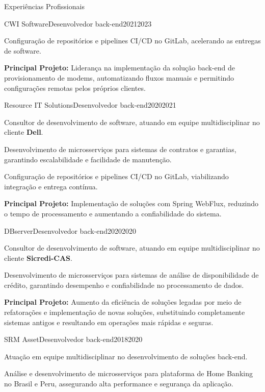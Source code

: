 \documentclass{domingosfelipe-resume}
\begin{document}
\begin{rSection}{Experiências Profissionais}
\begin{rExperienceSubsection}{CWI Software}{Desenvolvedor back-end}{2021}{2023}
        \item Configuração de repositórios e pipelines CI/CD no GitLab, acelerando as entregas de software.
        \item \textbf{Principal Projeto:} Liderança na implementação da solução back-end de provisionamento de modems, automatizando fluxos manuais e permitindo configurações remotas pelos próprios clientes.
    \end{rExperienceSubsection}
    \begin{rExperienceSubsection}{Resource IT Solutions}{Desenvolvedor back-end}{2020}{2021}
        \item Consultor de desenvolvimento de software, atuando em equipe multidisciplinar no cliente \textbf{Dell}.
        \item Desenvolvimento de microsserviços para sistemas de contratos e garantias, garantindo escalabilidade e facilidade de manutenção.
        \item Configuração de repositórios e pipelines CI/CD no GitLab, viabilizando integração e entrega contínua.
        \item \textbf{Principal Projeto:} Implementação de soluções com Spring WebFlux, reduzindo o tempo de processamento e aumentando a confiabilidade do sistema.
    \end{rExperienceSubsection}
    \begin{rExperienceSubsection}{DBserver}{Desenvolvedor back-end}{2020}{2020}
        \item Consultor de desenvolvimento de software, atuando em equipe multidisciplinar no cliente \textbf{Sicredi-CAS}.
        \item Desenvolvimento de microsserviços para sistemas de análise de disponibilidade de crédito, garantindo desempenho e confiabilidade no processamento de dados.
        \item \textbf{Principal Projeto:} Aumento da eficiência de soluções legadas por meio de refatorações e implementação de novas soluções, substituindo completamente sistemas antigos e resultando em operações mais rápidas e seguras.
    \end{rExperienceSubsection}
    \begin{rExperienceSubsection}{SRM Asset}{Desenvolvedor back-end}{2018}{2020}
        \item Atuação em equipe multidisciplinar no desenvolvimento de soluções back-end.
        \item Análise e desenvolvimento de microsserviços para plataforma de Home Banking no Brasil e Peru, assegurando alta performance e segurança da aplicação.

\end{rExperienceSubsection}
\end{rSection}
\end{document}
